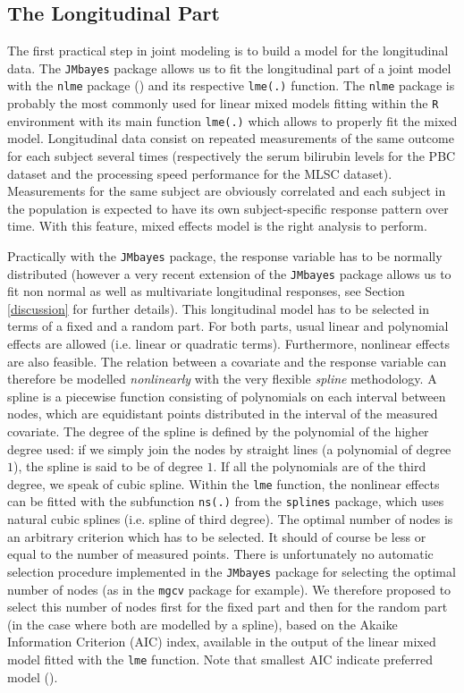 \documentclass[12pt]{article}
\begin{document}
\subsection{The Longitudinal Part}
\label{Longitudinal submodel}

The first practical step in joint modeling is to build a model for the longitudinal data. The \texttt{JMbayes} package allows us to fit the longitudinal part of a joint model with the \texttt{nlme} package (\cite{nlme}) and its respective \texttt{lme(.)} function. The \texttt{nlme} package is probably the most commonly used for linear mixed models fitting within the \texttt{R} environment with its main function \texttt{lme(.)} which allows to properly fit  the mixed model. Longitudinal data consist on repeated measurements of the same outcome for each subject several times (respectively the serum bilirubin levels for the PBC dataset and the processing speed performance for the MLSC dataset). Measurements for the same subject are obviously correlated and each subject in the population is expected to have its own subject-specific response pattern over time. With this feature, mixed effects model is the right analysis to perform.

Practically with the \texttt{JMbayes} package, the response variable has to be normally distributed (however a very recent extension of the \texttt{JMbayes} package allows us to fit non normal as well as multivariate longitudinal responses, see Section \ref{discussion} for further details). This longitudinal model has to be selected in terms of a fixed and a random part. For both parts, usual linear and polynomial effects are allowed (i.e. linear or quadratic terms). Furthermore, nonlinear effects are also feasible. The relation between a covariate and the response variable can therefore be modelled \textit{nonlinearly} with the very flexible \textit{spline} methodology. A spline is a piecewise function consisting of polynomials on each interval between nodes, which are equidistant points distributed in the interval of the measured covariate. The degree of the spline is defined by the polynomial of the higher degree used: if we simply join the nodes by straight lines (a polynomial of degree $1$), the spline is said to be of degree $1$. If all the polynomials are of the third degree, we speak of cubic spline. Within the \texttt{lme} function, the nonlinear effects can be fitted with the subfunction \texttt{ns(.)} from the \texttt{splines} package, which uses natural cubic splines (i.e. spline of third degree). The optimal number of nodes is an arbitrary criterion which has to be selected. It should of course be less or equal to the number of measured points. There is unfortunately no automatic selection procedure implemented in the \texttt{JMbayes} package for selecting the optimal number of nodes (as in the \texttt{mgcv} package for example). We therefore proposed to select this number of nodes first for the fixed part and then for the random part (in the case where both are modelled by a spline), based on the Akaike Information Criterion (AIC) index, available in the output of the linear mixed model fitted with the \texttt{lme} function. Note that smallest AIC indicate preferred model (\cite{akaike_new_1974}). 
\end{document}
